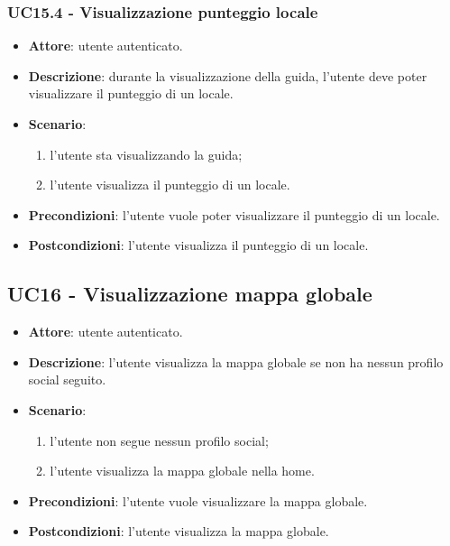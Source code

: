 \subsubsection{UC15.4 - Visualizzazione punteggio locale}
\begin{itemize}
    \item \textbf{Attore}: utente autenticato.
    \item \textbf{Descrizione}: durante la visualizzazione della guida, l'utente deve poter visualizzare il punteggio di un locale.
    \item \textbf{Scenario}:
    \begin{enumerate}
        \item l'utente sta visualizzando la guida;
        \item l'utente visualizza il punteggio di un locale.
    \end{enumerate}
    \item \textbf{Precondizioni}: l'utente vuole poter visualizzare il punteggio di un locale.
    \item \textbf{Postcondizioni}: l'utente visualizza il punteggio di un locale.
\end{itemize}

\subsection{UC16 - Visualizzazione mappa globale}
\begin{itemize}
    \item \textbf{Attore}: utente autenticato.
    \item \textbf{Descrizione}: l'utente visualizza la mappa globale se non ha nessun profilo social seguito.
    \item \textbf{Scenario}:
    \begin{enumerate}
        \item l'utente non segue nessun profilo social;
        \item l'utente visualizza la mappa globale nella home.
    \end{enumerate}

    \item \textbf{Precondizioni}: l'utente vuole visualizzare la mappa globale.
    \item \textbf{Postcondizioni}: l'utente visualizza la mappa globale.
\end{itemize}

